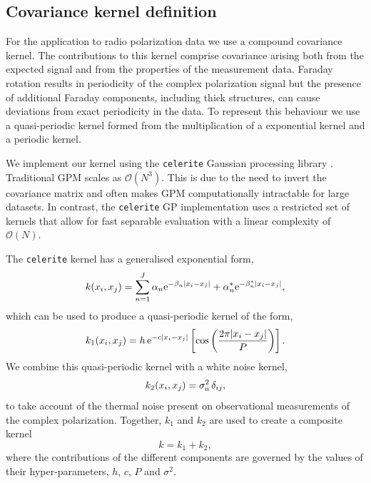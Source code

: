 \documentclass[fleqn,usenatbib]{mnras}
\begin{document}
\subsection{Covariance kernel definition}
\label{sec:kernels}

For the application to radio polarization data we use a compound covariance kernel. The contributions to this kernel comprise covariance arising both from the expected signal and from the properties of the measurement data. Faraday rotation results in periodicity of the complex polarization signal but the presence of additional Faraday components, including thick structures, can cause deviations from exact periodicity in the data. To represent this behaviour we use a quasi-periodic kernel formed from the multiplication of a exponential kernel and a periodic kernel. 

We implement our kernel using the {\tt celerite} Gaussian processing library \citep{celerite}. Traditional GPM scales as $\mathcal{O}(N^3)$. This is due to the need to invert the covariance matrix and often makes GPM computationally intractable for large datasets. In contrast,  the {\tt celerite} GP implementation uses a restricted set of kernels that allow for fast separable evaluation with a linear complexity of $\mathcal{O}(N)$. 

The {\tt celerite} kernel has a generalised exponential form,
%
\begin{equation}
    k(x_i,x_j) = \sum_{n=1}^{J}{\alpha_n {\rm e}^{-\beta_n |x_i - x_j|} + \alpha_n^{\ast} {\rm e}^{-\beta_n^{\ast} |x_i - x_j|}},
\end{equation}
%
which can be used to produce a quasi-periodic kernel of the form,
%
\begin{equation}
\label{eq:celkernel}
k_1(x_i,x_j)=h\,{\rm e}^{-c|x_i - x_j|}\left[\cos\left(\frac{2\pi|x_i - x_j|}{P}\right)\right].
\end{equation}
%
We combine this quasi-periodic kernel with a white noise kernel,
%
\begin{equation}
\label{eq:whitekernel}
k_2(x_i,x_j)=\sigma_{\rm n}^2\,\delta_{ij},
\end{equation}
%
to take account of the thermal noise present on observational measurements of the complex polarization. Together, $k_1$ and $k_2$ are used to create a composite kernel 
%
\begin{equation}
k = k_1 + k_2, 
\end{equation}
%
where the contributions of the different components are governed by the values of their hyper-parameters, $h$, $c$, $P$ and $\sigma^2$.
\end{document}
